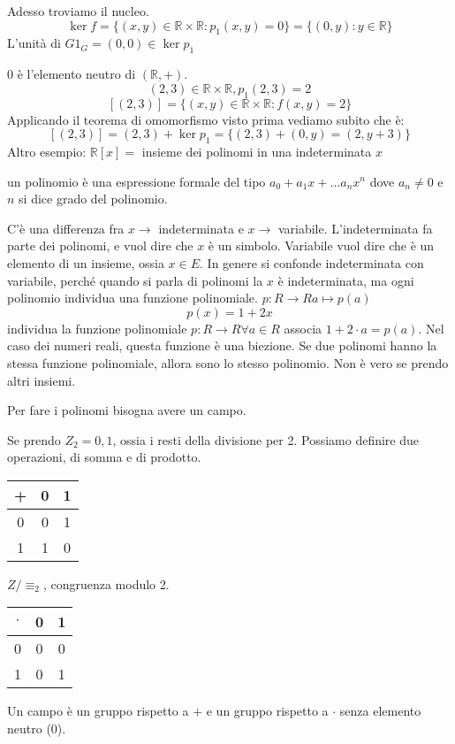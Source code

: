 Adesso troviamo il nucleo.
\[
\ker f = \{ (x, y) \in \mathbb{R} \times \mathbb{R} : p_1(x, y) = 0 \} = \{ (0, y) : y \in \mathbb{R} \}
\]
L'unit\`a di $G 1_G = (0, 0) \in \ker p_1$

0 \`e l'elemento neutro di $(\mathbb{R}, +)$.
\[
(2, 3) \in \mathbb{R} \times \mathbb{R}, p_1(2, 3) = 2
\]
\[
[(2, 3)] = \{ (x, y) \in \mathbb{R} \times \mathbb{R} : f(x, y) = 2\}
\]
Applicando il teorema di omomorfismo visto prima vediamo subito che \`e:
\[
[(2,3)] = (2, 3) + \ker p_1 = \{ (2, 3) + (0, y) = (2, y + 3) \}
\]
Altro esempio:
$\mathbb{R}[x] =$ insieme dei polinomi in una indeterminata $x$

un polinomio \`e una espressione formale del tipo $a_0 + a_1 x + \dots a_n x^n$ dove $a_n \neq 0$ e $n$ si dice grado del polinomio.

C'\`e una differenza fra $x \to$ indeterminata e $x \to $ variabile. L'indeterminata fa parte dei polinomi, e vuol dire che $x$ \`e un simbolo. Variabile vuol dire che \`e un elemento di un insieme, ossia $x \in E$. In genere si confonde indeterminata con variabile, perch\'e quando si parla di polinomi la $x$ \`e indeterminata, ma ogni polinomio individua una funzione polinomiale. $p : R \to R a \mapsto p(a)$
\[
p(x) = 1 + 2x
\]
individua la funzione polinomiale $p : R \to R \forall a \in R$ associa $1 + 2 \cdot a = p(a)$. Nel caso dei numeri reali, questa funzione \`e una biezione. Se due polinomi hanno la stessa funzione polinomiale, allora sono lo stesso polinomio. Non \`e vero se prendo altri insiemi.

Per fare i polinomi bisogna avere un campo.

Se prendo $Z_2 = {0,1}$, ossia i resti della divisione per 2. Possiamo definire due operazioni, di somma e di prodotto.

\begin{tabular}{c|cc}
+ & 0 & 1 \\
\hline
0 & 0 & 1 \\
1 & 1 & 0
\end{tabular}

$Z / \equiv_2$, congruenza modulo 2.

\begin{tabular}{c|cc}
$\cdot$ & 0 & 1 \\
\hline
0 & 0 & 0 \\
1 & 0 & 1
\end{tabular}

Un campo \`e un gruppo rispetto a $+$ e un gruppo rispetto a $\cdot$ senza elemento neutro (0).

